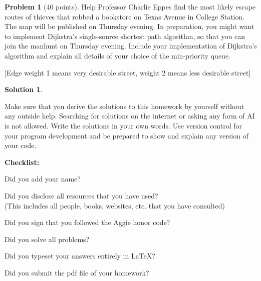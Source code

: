 \documentclass{article}
\theoremstyle{definition}
\newtheorem{problem}{Problem}
\newtheorem*{solution}{Solution}
\newcommand{\checklist}{\noindent\textbf{Checklist:}
\begin{compactitem}[$\Box$] 
\item Did you add your name? 
\item Did you disclose all resources that you have used? \\
(This includes all people, books, websites, etc. that you have consulted)
\item Did you sign that you followed the Aggie honor code? 
\item Did you solve all problems? 
\item Did you typeset your answers entirely in LaTeX? 
\item Did you submit the pdf file of your homework?
\end{compactitem}
}
\begin{document}
\begin{problem}[40 points]
  Help Professor Charlie Eppes find the most likely escape routes of
  thieves that robbed a bookstore on Texas Avenue in College
  Station. The map will be published on Thursday evening. In
  preparation, you might want to implement Dijkstra's single-source
  shortest path algorithm, so that you can join the manhunt on
  Thursday evening. Include your implementation of
  Dijkstra's algorithm and explain all details of your choice of the
  min-priority queue.

  [Edge weight 1 means very desirable street, weight
  2 means less desirable street]

  
\end{problem}
\begin{solution}
\end{solution}


Make sure that you derive the solutions to this homework by yourself
without any outside help. Searching for solutions on the internet or
asking any form of AI is not allowed. Write the solutions in your own
words. Use version control for your program development and be
prepared to show and explain any version of your code. 


\medskip



\goodbreak
\checklist
\end{document}
